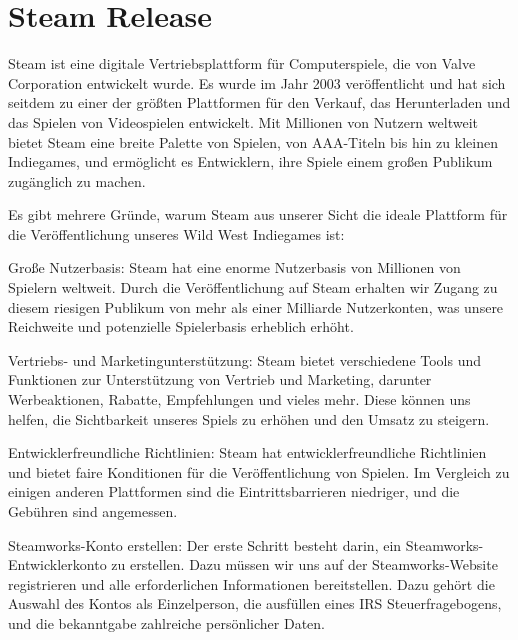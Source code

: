 
\chapter{Steam Release}\label{ch:steamrelease}
\renewcommand{\kapitelautor}{Autor: Nils} %

%

Steam ist eine digitale Vertriebsplattform für Computerspiele, die von Valve Corporation entwickelt wurde. Es wurde im Jahr 2003 veröffentlicht und hat sich seitdem zu einer der größten Plattformen für den Verkauf, das Herunterladen und das Spielen von Videospielen entwickelt. Mit Millionen von Nutzern weltweit bietet Steam eine breite Palette von Spielen, von AAA-Titeln bis hin zu kleinen Indiegames, und ermöglicht es Entwicklern, ihre Spiele einem großen Publikum zugänglich zu machen.\cite[vgl.]{Steam}


Es gibt mehrere Gründe, warum Steam aus unserer Sicht die ideale Plattform für die Veröffentlichung unseres Wild West Indiegames ist:

Große Nutzerbasis: Steam hat eine enorme Nutzerbasis von Millionen von Spielern weltweit. Durch die Veröffentlichung auf Steam erhalten wir Zugang zu diesem riesigen Publikum von mehr als einer Milliarde Nutzerkonten, was unsere Reichweite und potenzielle Spielerbasis erheblich erhöht.\cite[vgl.]{Steamzahlen}

Vertriebs- und Marketingunterstützung: Steam bietet verschiedene Tools und Funktionen zur Unterstützung von Vertrieb und Marketing, darunter Werbeaktionen, Rabatte, Empfehlungen und vieles mehr. Diese können uns helfen, die Sichtbarkeit unseres Spiels zu erhöhen und den Umsatz zu steigern.

Entwicklerfreundliche Richtlinien: Steam hat entwicklerfreundliche Richtlinien und bietet faire Konditionen für die Veröffentlichung von Spielen. Im Vergleich zu einigen anderen Plattformen sind die Eintrittsbarrieren niedriger, und die Gebühren sind angemessen.


Steamworks-Konto erstellen: Der erste Schritt besteht darin, ein Steamworks-Entwicklerkonto zu erstellen. Dazu müssen wir uns auf der Steamworks-Website registrieren und alle erforderlichen Informationen bereitstellen. Dazu gehört die Auswahl des Kontos als Einzelperson, die ausfüllen eines IRS Steuerfragebogens, und die bekanntgabe zahlreiche persönlicher Daten.

